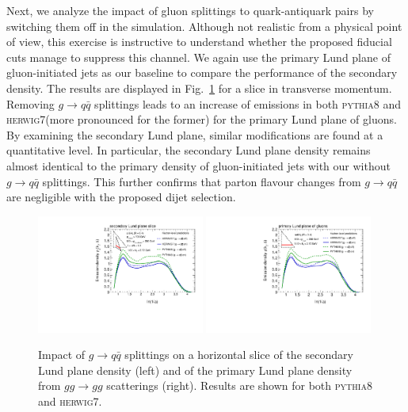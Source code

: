 \documentclass[a4paper,11pt]{article}
\newcommand{\py}{{\textsc{pythia}}8\xspace}
\newcommand{\hw}{{\textsc{herwig}}7\xspace}
\begin{document}
Next, we analyze the impact of gluon splittings to quark-antiquark pairs by switching them off in the simulation. Although not realistic from a physical point of view, this exercise is instructive to understand whether the proposed fiducial cuts manage to suppress this channel. We again use the primary Lund plane of gluon-initiated jets as our baseline to compare the performance of the secondary density. The results are displayed in Fig.~\ref{fig:g2qqBarOff} for a slice in transverse momentum. Removing $g\to q\bar q$ splittings leads to an increase of emissions in both \py and \hw (more pronounced for the former) for the primary Lund plane of gluons. By examining the secondary Lund plane, similar modifications are found at a quantitative level. In particular, the secondary Lund plane density remains almost identical to the primary density of gluon-initiated jets with our without $g\to q\bar q$ splittings. This further confirms that parton flavour changes from $g\to q\bar{q}$ are negligible with the proposed dijet selection.

\begin{figure}
    \centering
    \includegraphics[width = 0.49\textwidth]{Figure5a.pdf}
        \includegraphics[width = 0.49\textwidth]{Figure5b.pdf}
    \caption{Impact of $g\to q\bar q$ splittings on a horizontal slice of the secondary Lund plane density (left) and of the primary Lund plane density from $gg\to gg$ scatterings (right). Results are shown for both \py and \hw.}
    \label{fig:g2qqBarOff}
\end{figure}
\end{document}
